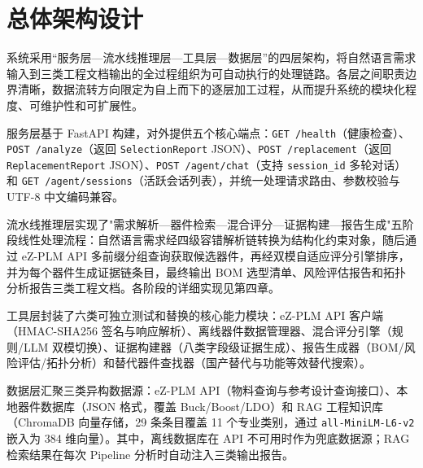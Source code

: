 
\section{总体架构设计}
\label{sec:architectrue}
系统采用“服务层—流水线推理层—工具层—数据层”的四层架构，将自然语言需求输入到三类工程文档输出的全过程组织为可自动执行的处理链路。各层之间职责边界清晰，数据流转方向限定为自上而下的逐层加工过程，从而提升系统的模块化程度、可维护性和可扩展性。

服务层基于 FastAPI 构建，对外提供五个核心端点：\texttt{GET /health}（健康检查）、\texttt{POST /analyze}（返回 \texttt{SelectionReport} JSON）、\texttt{POST /replacement}（返回 \texttt{ReplacementReport} JSON）、\texttt{POST /agent/chat}（支持 \texttt{session\_id} 多轮对话）和 \texttt{GET /agent/sessions}（活跃会话列表），并统一处理请求路由、参数校验与 UTF-8 中文编码兼容。

流水线推理层实现了"需求解析—器件检索—混合评分—证据构建—报告生成"五阶段线性处理流程：自然语言需求经四级容错解析链转换为结构化约束对象，随后通过 eZ-PLM API 多前缀分组查询获取候选器件，再经双模自适应评分引擎排序，并为每个器件生成证据链条目，最终输出 BOM 选型清单、风险评估报告和拓扑分析报告三类工程文档。各阶段的详细实现见第四章。

工具层封装了六类可独立测试和替换的核心能力模块：eZ-PLM API 客户端（HMAC-SHA256 签名与响应解析）、离线器件数据管理器、混合评分引擎（规则/LLM 双模切换）、证据构建器（八类字段级证据生成）、报告生成器（BOM/风险评估/拓扑分析）和替代器件查找器（国产替代与功能等效替代搜索）。

数据层汇聚三类异构数据源：eZ-PLM API（物料查询与参考设计查询接口）、本地器件数据库（JSON 格式，覆盖 Buck/Boost/LDO）和 RAG 工程知识库（ChromaDB 向量存储，29 条条目覆盖 11 个专业类别，通过 \texttt{all-MiniLM-L6-v2} 嵌入为 384 维向量）。其中，离线数据库在 API 不可用时作为兜底数据源；RAG 检索结果在每次 Pipeline 分析时自动注入三类输出报告。

